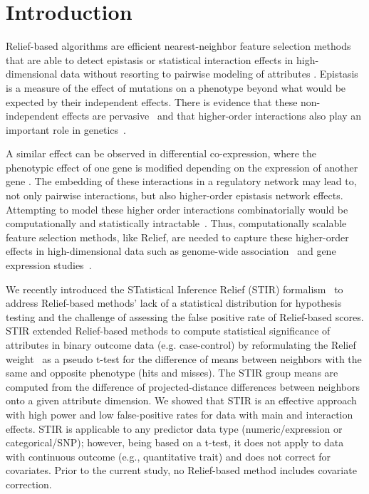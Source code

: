 \documentclass[10pt]{article}
\begin{document}

\linenumbers

\section{Introduction}

Relief-based algorithms are efficient nearest-neighbor feature selection methods that are able to detect epistasis or statistical interaction effects in high-dimensional data without resorting to pairwise modeling of attributes \cite{urbanowicz17b,kononenko97, mckinney09, rendell92}. Epistasis is a measure of the effect of mutations on a phenotype beyond what would be expected by their independent effects. There is evidence that these non-independent effects are pervasive~\cite{breen12} and that higher-order interactions also play an important role in genetics~\cite{weinreich13}. 

A similar effect can be observed in differential co-expression, where the phenotypic effect of one gene is modified depending on the expression of another gene \cite{lareau15,diffcoexp10}. The embedding of these interactions in a regulatory network may lead to, not only pairwise interactions, but also higher-order epistasis network effects. Attempting to model these higher order interactions combinatorially would be computationally and statistically intractable~\cite{riesselman18}. Thus, computationally scalable feature selection methods, like Relief, are needed to capture these higher-order effects in high-dimensional data such as genome-wide association~\cite{titv} and gene expression studies~\cite{stir}.

We recently introduced the STatistical Inference Relief (STIR) formalism~\cite{stir} to address Relief-based methods' lack of a statistical distribution for hypothesis testing and the challenge of assessing the false positive rate of Relief-based scores.
STIR extended Relief-based methods to compute statistical significance of attributes in binary outcome data (e.g. case-control) by reformulating the Relief weight~\cite{mckinney13} as a pseudo t-test for the difference of means between neighbors with the same and opposite phenotype (hits and misses).
The STIR group means are computed from the difference of projected-distance differences between neighbors onto a given attribute dimension. We showed that STIR is an effective approach with high power and low false-positive rates for data with main and interaction effects. 
STIR is applicable to any predictor data type (numeric/expression or categorical/SNP); however, being based on a t-test, it does not apply to data with continuous outcome (e.g., quantitative trait) and does not correct for covariates.
Prior to the current study, no Relief-based method includes covariate correction.  
\end{document}
